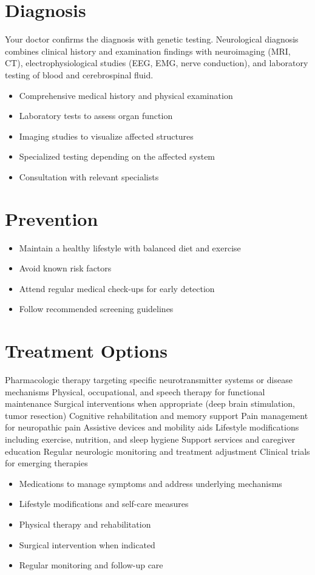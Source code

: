 \section{Diagnosis}
Your doctor confirms the diagnosis with genetic testing. Neurological diagnosis combines clinical history and examination findings with neuroimaging (MRI, CT), electrophysiological studies (EEG, EMG, nerve conduction), and laboratory testing of blood and cerebrospinal fluid.

\begin{itemize}[noitemsep]
  \item Comprehensive medical history and physical examination
  \item Laboratory tests to assess organ function
  \item Imaging studies to visualize affected structures
  \item Specialized testing depending on the affected system
  \item Consultation with relevant specialists
\end{itemize}
\section{Prevention}
\begin{itemize}[noitemsep]
  \item Maintain a healthy lifestyle with balanced diet and exercise
  \item Avoid known risk factors
  \item Attend regular medical check-ups for early detection
  \item Follow recommended screening guidelines
\end{itemize}
\section{Treatment Options}
Pharmacologic therapy targeting specific neurotransmitter systems or disease mechanisms Physical, occupational, and speech therapy for functional maintenance Surgical interventions when appropriate (deep brain stimulation, tumor resection) Cognitive rehabilitation and memory support Pain management for neuropathic pain Assistive devices and mobility aids Lifestyle modifications including exercise, nutrition, and sleep hygiene Support services and caregiver education Regular neurologic monitoring and treatment adjustment Clinical trials for emerging therapies

\begin{itemize}[noitemsep]
  \item Medications to manage symptoms and address underlying mechanisms
  \item Lifestyle modifications and self-care measures
  \item Physical therapy and rehabilitation
  \item Surgical intervention when indicated
  \item Regular monitoring and follow-up care
\end{itemize}
